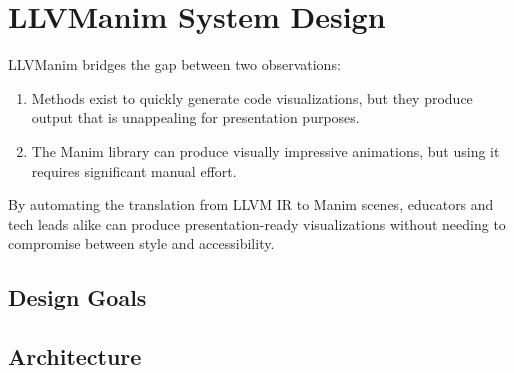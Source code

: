 \section{LLVManim System Design}
LLVManim bridges the gap between two observations:
\begin{enumerate}
    \item Methods exist to quickly generate code visualizations, but they produce
    output that is unappealing for presentation purposes.
    \item The Manim library can produce visually impressive animations, but using
    it requires significant manual effort.
\end{enumerate}
By automating the translation from LLVM IR to Manim scenes, educators
and tech leads alike can produce presentation-ready visualizations without
needing to compromise between style and accessibility.

\subsection{Design Goals}


\subsection{Architecture}


